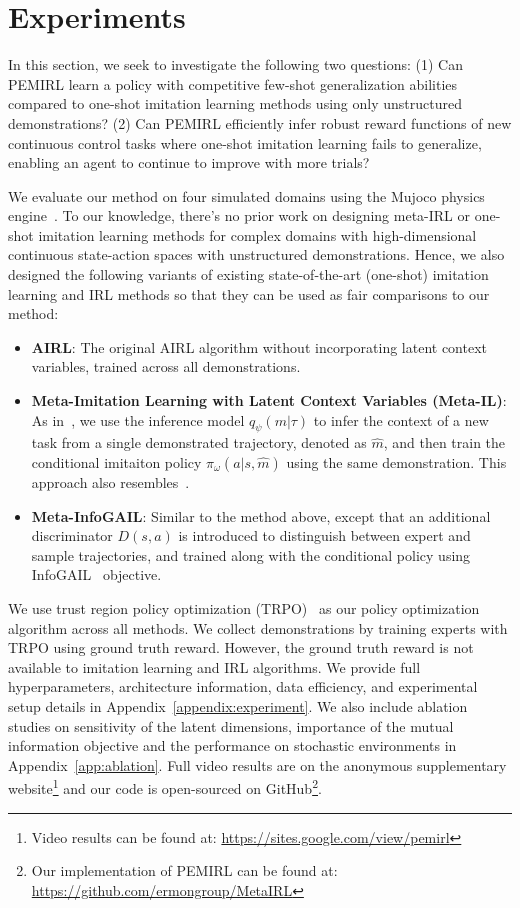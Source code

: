 \section{Experiments}
\label{sec:experiments}

In this section, we seek to investigate the following two questions: (1) Can PEMIRL learn a policy with competitive few-shot generalization abilities compared to one-shot imitation learning methods using only unstructured demonstrations? (2) Can PEMIRL efficiently infer robust reward functions of new continuous control tasks where one-shot imitation learning fails to generalize, enabling an agent to continue to improve with more trials?

We evaluate our method on four simulated domains using the Mujoco physics engine~\cite{mujoco}. To our knowledge, there's no prior work on designing meta-IRL or one-shot imitation learning methods for complex domains with high-dimensional continuous state-action spaces with unstructured demonstrations. Hence, we also designed the following variants of existing state-of-the-art (one-shot) imitation learning and IRL methods so that they can be used as fair comparisons to our method:
\begin{itemize}[leftmargin=.3in]
\item \textbf{AIRL}: The original AIRL algorithm without incorporating latent context variables, trained across all demonstrations.
\item \textbf{Meta-Imitation Learning with Latent Context Variables (Meta-IL)}: As in~\citep{pearl}, we use the inference model $q_\psi(m|\tau)$ to infer the context of a new task from a single demonstrated trajectory, denoted as $\hat{m}$, and then train the conditional imitaiton policy $\pi_\omega(a|s,\hat{m})$ using the same demonstration. This approach also resembles~\cite{duan2017}.
\item \textbf{Meta-InfoGAIL}: Similar to the method above, except that an additional discriminator $D(s,a)$ is introduced to distinguish between expert and sample trajectories, and trained along with the conditional policy using InfoGAIL~\cite{li2017infogail} objective.
\end{itemize}
We use trust region policy optimization (TRPO)~\cite{trpo} as our policy optimization algorithm across all methods. We collect demonstrations by training experts with TRPO using ground truth reward. However, the ground truth reward is not available to imitation learning and IRL algorithms. We provide full hyperparameters, architecture information, data efficiency, and experimental setup details in Appendix~\ref{appendix:experiment}. We also include ablation studies on sensitivity of the latent dimensions, importance of the mutual information objective and the performance on stochastic environments in Appendix~\ref{app:ablation}. Full video results are on the anonymous supplementary website\footnote{Video results can be found at: \url{https://sites.google.com/view/pemirl}} and our code is open-sourced on GitHub\footnote{Our implementation of PEMIRL can be found at: \url{https://github.com/ermongroup/MetaIRL}}.

